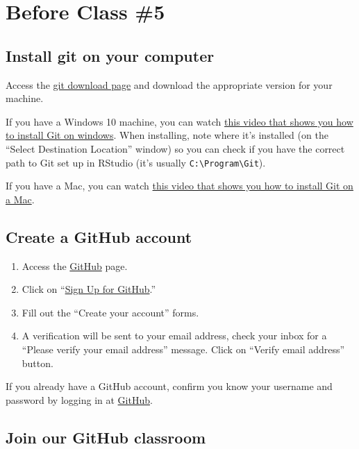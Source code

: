 \documentclass[
]{book}
\begin{document}
\hypertarget{before-class-5}{%
\section{Before Class \#5}\label{before-class-5}}

\hypertarget{install-git-on-your-computer}{%
\subsection{Install git on your computer}\label{install-git-on-your-computer}}

Access the \href{https://git-scm.com/download}{git download page} and download the appropriate version for your machine.

If you have a Windows 10 machine, you can watch \href{https://www.youtube.com/watch?v=nbFwejIsHlY}{this video that shows you how to install Git on windows}. When installing, note where it's installed (on the ``Select Destination Location'' window) so you can check if you have the correct path to Git set up in RStudio (it's usually \texttt{C:\textbackslash{}Program\textbackslash{}Git}).

If you have a Mac, you can watch \href{https://www.youtube.com/watch?v=PSULlxUk744}{this video that shows you how to install Git on a Mac}.

\hypertarget{create-a-github-account}{%
\subsection{Create a GitHub account}\label{create-a-github-account}}

\begin{enumerate}
\def\labelenumi{\arabic{enumi}.}
\item
  Access the \href{https://github.com/}{GitHub} page.
\item
  Click on ``\href{https://github.com/join}{Sign Up for GitHub}.''
\item
  Fill out the ``Create your account'' forms.
\item
  A verification will be sent to your email address, check your inbox for a ``Please verify your email address'' message. Click on ``Verify email address'' button.
\end{enumerate}

If you already have a GitHub account, confirm you know your username and password by logging in at \href{https://github.com/}{GitHub}.

\hypertarget{join-our-github-classroom}{%
\subsection{Join our GitHub classroom}\label{join-our-github-classroom}}
\end{document}
